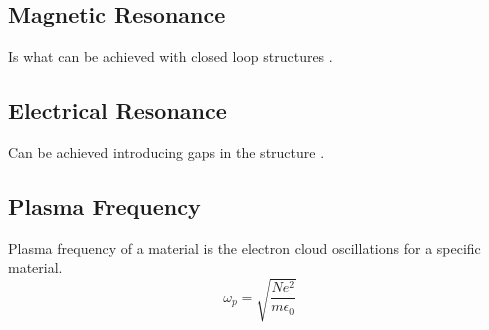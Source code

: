     \subsection{\textsf{Magnetic Resonance}}
        Is what can be achieved with closed loop structures \cite{abdulkarim_review_2022}.
    
    \subsection{\textsf{Electrical Resonance}}
        Can be achieved introducing gaps in the structure \cite{abdulkarim_review_2022}.

    \subsection{\textsf{Plasma Frequency}}
        Plasma frequency of a material is the electron cloud oscillations for a specific material.
        \begin{equation}
            \omega_p = \sqrt{\frac{Ne^2}{m\epsilon_0}}
        \end{equation}
    